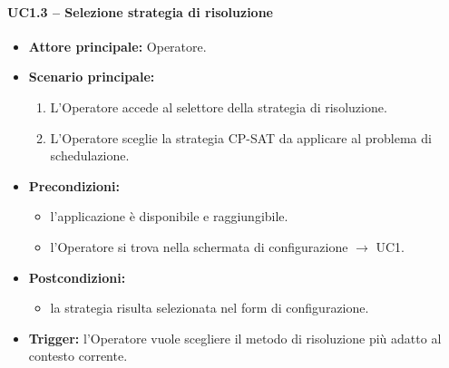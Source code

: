 \paragraph{UC1.3 -- Selezione strategia di risoluzione}
\begin{itemize}
    \item \textbf{Attore principale:} Operatore.
    \item \textbf{Scenario principale:}
    \begin{enumerate}
        \item L'Operatore accede al selettore della strategia di risoluzione.
        \item L'Operatore sceglie la strategia CP-SAT da applicare al problema di schedulazione.
    \end{enumerate}
    \item \textbf{Precondizioni:}
    \begin{itemize}
        \item l'applicazione è disponibile e raggiungibile.
        \item l'Operatore si trova nella schermata di configurazione $\rightarrow$ UC1.
    \end{itemize}
    \item \textbf{Postcondizioni:}
    \begin{itemize}
        \item la strategia risulta selezionata nel form di configurazione.
    \end{itemize}
    \item \textbf{Trigger:} l'Operatore vuole scegliere il metodo di risoluzione più adatto al contesto corrente.
\end{itemize}

